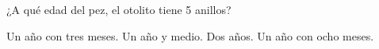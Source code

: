 ¿A qué edad del pez, el otolito tiene 5 anillos?

\begin{choices}
    \choice Un año con tres meses.
    \choice Un año y medio.
    \choice Dos años.
    \CorrectChoice Un año con ocho meses.
\end{choices}
